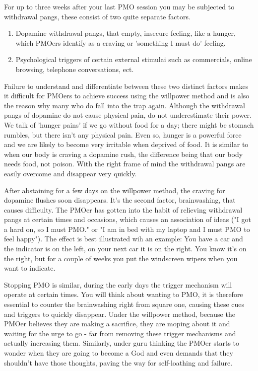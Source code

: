 \documentclass[easypeasy.tex]{subfiles}
\begin{document}
For up to three weeks after your last PMO session you may be subjected to withdrawal pangs, these consist of two quite separate factors.
\begin{enumerate}
  \item Dopamine withdrawal pangs, that empty, insecure feeling, like a hunger, which PMOers identify as a craving or 'something I must do' feeling.

  \item Psychological triggers of certain external stimulai such as commercials, online browsing, telephone conversations, ect.
\end{enumerate}

Failure to understand and differentiate between these two distinct factors makes it difficult for PMOers to achieve success using the willpower method and is also the reason why many who do fall into the trap again. Although the withdrawal pangs of dopamine do not cause physical pain, do not underestimate their power. We talk of 'hunger pains' if we go without food for a day; there might be stomach rumbles, but there isn't any physical pain. Even so, hunger is a powerful force and we are likely to become very irritable when deprived of food. It is similar to when our body is craving a dopamine rush, the difference being that our body needs food, not poison. With the right frame of mind the withdrawal pangs are easily overcome and disappear very quickly.

After abstaining for a few days on the willpower method, the craving for dopamine flushes soon disappears. It's the second factor, brainwashing, that causes difficulty. The PMOer has gotten into the habit of relieving withdrawal pangs at certain times and occasions, which causes an association of ideas ("I got a hard on, so I must PMO." or "I am in bed with my laptop and I must PMO to feel happy"). The effect is best illustrated wih an example: You have a car and the indicator is on the left, on your next car it is on the right. You know it's on the right, but for a couple of weeks you put the windscreen wipers when you want to indicate.

Stopping PMO is similar, during the early days the trigger mechanism will operate at certain times. You will think about wanting to PMO, it is therefore essential to counter the brainwashing right from square one, causing these cues and triggers to quickly disappear. Under the willpower method, because the PMOer believes they are making a sacrifice, they are moping about it and waiting for the urge to go - far from removing these trigger mechanisms and actually increasing them. Similarly, under guru thinking the PMOer starts to wonder when they are going to become a God and even demands that they shouldn't have those thoughts, paving the way for self-loathing and failure.
\end{document}
